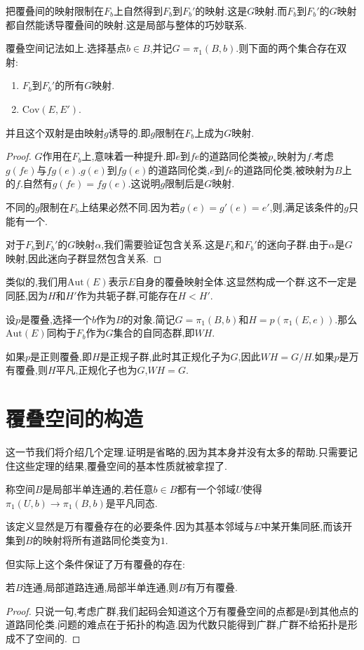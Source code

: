 把覆叠间的映射限制在$F_b$上自然得到$F_b$到$F_b'$的映射.这是$G$映射.而$F_b$到$F_b'$的$G$映射都自然能诱导覆叠间的映射.这是局部与整体的巧妙联系.
\begin{theorem}
    覆叠空间记法如上.选择基点$b\in B$,并记$G=\pi_1(B,b)$.则下面的两个集合存在双射:
    \begin{enumerate}
        \item $F_b$到$F_b'$的所有$G$映射.
        \item $\mathrm{Cov}(E,E')$.
    \end{enumerate}
    并且这个双射是由映射$g$诱导的.即$g$限制在$F_b$上成为$G$映射.
\end{theorem}
\begin{proof}
    $G$作用在$F_b$上,意味着一种提升.即$e$到$f e$的道路同伦类被$p_*$映射为$f$.考虑$g(fe)$与$f g(e)$.$g(e)$到$f g(e)$的道路同伦类,$e$到$fe$的道路同伦类,被映射为$B$上的$f$.自然有$g(fe)=fg(e)$.这说明$g$限制后是$G$映射.

    不同的$g$限制在$F_b$上结果必然不同.因为若$g(e)=g'(e)=e'$,则,满足该条件的$g$只能有一个.

    对于$F_b$到$F_b'$的$G$映射$\alpha$,我们需要验证包含关系.这是$F_b$和$F_b'$的迷向子群.由于$\alpha$是$G$映射,因此迷向子群显然包含关系.
\end{proof}
类似的,我们用$\mathrm{Aut}(E)$表示$E$自身的覆叠映射全体.这显然构成一个群.这不一定是同胚,因为$H$和$H'$作为共轭子群,可能存在$H <H'$.
\begin{corollary}
    设$p$是覆叠,选择一个$b$作为$B$的对象.简记$G=\pi_1(B,b)$和$H=p(\pi_1(E,e))$.那么$\mathrm{Aut}(E)$同构于$F_b$作为$G$集合的自同态群,即$WH$.

    如果$p$是正则覆叠,即$H$是正规子群,此时其正规化子为$G$,因此$WH=G/H$.如果$p$是万有覆叠,则$H$平凡,正规化子也为$G$,$WH=G$.
\end{corollary}

\section{覆叠空间的构造}
这一节我们将介绍几个定理.证明是省略的,因为其本身并没有太多的帮助.只需要记住这些定理的结果,覆叠空间的基本性质就被拿捏了.
\begin{definition}
    称空间$B$是局部半单连通的,若任意$b \in B$都有一个邻域$U$使得$\pi_1(U,b) \to \pi_1(B,b)$是平凡同态.
\end{definition}
该定义显然是万有覆叠存在的必要条件.因为其基本邻域与$E$中某开集同胚,而该开集到$B$的映射将所有道路同伦类变为$1$.

但实际上这个条件保证了万有覆叠的存在:
\begin{theorem}
    若$B$连通,局部道路连通,局部半单连通,则$B$有万有覆叠.
\end{theorem}
\begin{proof}
    只说一句,考虑广群,我们起码会知道这个万有覆叠空间的点都是$b$到其他点的道路同伦类.问题的难点在于拓扑的构造.因为代数只能得到广群,广群不给拓扑是形成不了空间的.
\end{proof}

